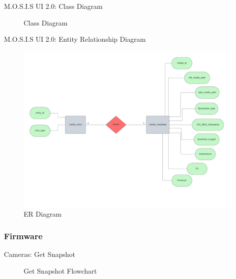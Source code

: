\documentclass[17pt, aspectratio=169]{beamer}
\begin{document}
\begin{frame}{M.O.S.I.S UI 2.0: Class Diagram}
	\begin{figure}
		\caption{Class Diagram}
	\end{figure}
\end{frame}
\begin{frame}{M.O.S.I.S UI 2.0: Entity Relationship Diagram}
	\begin{figure}
		\includegraphics[page=1,height=0.65\textheight]{../../Progress_Report_Document/Appendix/Design_Documentation/ER_Diagram/Figures/ER_Diagram_MOSIS.pdf}
		\caption{ER Diagram}
	\end{figure}
\end{frame}
\subsubsection{Firmware}
\begin{frame}{Cameras: Get Snapshot}
	\begin{figure}[H]
		\begin{center}
			\begin{small}
			\end{small}
		\end{center}
		\caption{Get Snapshot Flowchart}
	\end{figure}
\end{frame}
\end{document}
